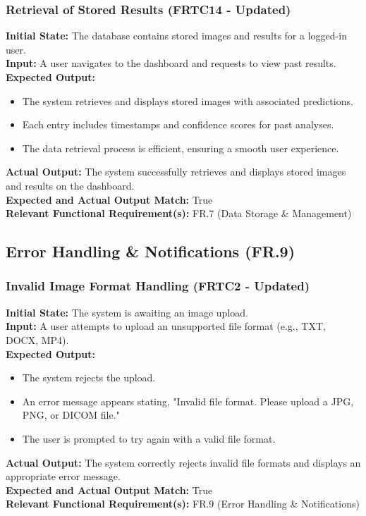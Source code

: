 \documentclass[12pt, titlepage]{article}
\begin{document}
\subsubsection{Retrieval of Stored Results (FRTC14 - Updated)}
\textbf{Initial State:} The database contains stored images and results for a logged-in user.\\
\textbf{Input:} A user navigates to the dashboard and requests to view past results.\\
\textbf{Expected Output:}
\begin{itemize}
\item The system retrieves and displays stored images with associated predictions.
\item Each entry includes timestamps and confidence scores for past analyses.
\item The data retrieval process is efficient, ensuring a smooth user experience.
\end{itemize}
\textbf{Actual Output:} The system successfully retrieves and displays stored images and results on the dashboard.\\
\textbf{Expected and Actual Output Match:} True\\
\textbf{Relevant Functional Requirement(s):} FR.7 (Data Storage \& Management)

\subsection{Error Handling \& Notifications (FR.9)}
\subsubsection{Invalid Image Format Handling (FRTC2 - Updated)}
\textbf{Initial State:} The system is awaiting an image upload.\\
\textbf{Input:} A user attempts to upload an unsupported file format (e.g., TXT, DOCX, MP4).\\
\textbf{Expected Output:}
\begin{itemize}
\item The system rejects the upload.
\item An error message appears stating, "Invalid file format. Please upload a JPG, PNG, or DICOM file."
\item The user is prompted to try again with a valid file format.
\end{itemize}
\textbf{Actual Output:} The system correctly rejects invalid file formats and displays an appropriate error message.\\
\textbf{Expected and Actual Output Match:} True\\
\textbf{Relevant Functional Requirement(s):} FR.9 (Error Handling \& Notifications)
\end{document}
